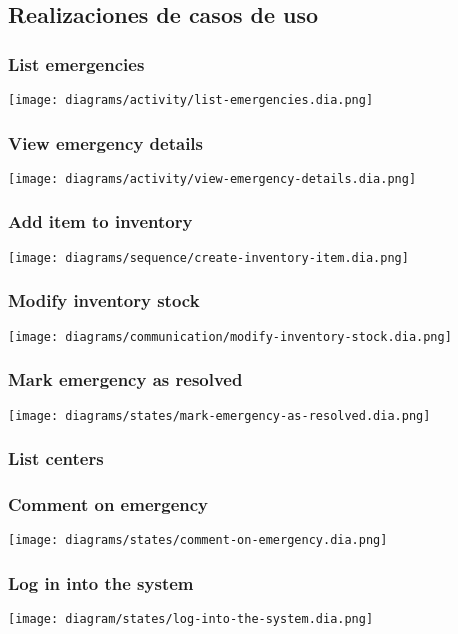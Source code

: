 \subsection{Realizaciones de casos de uso}

\subsubsection{List emergencies}
\texttt{[image: diagrams/activity/list-emergencies.dia.png]}

\subsubsection{View emergency details}
\texttt{[image: diagrams/activity/view-emergency-details.dia.png]}

\subsubsection{Add item to inventory}
\texttt{[image: diagrams/sequence/create-inventory-item.dia.png]}

\subsubsection{Modify inventory stock}
\texttt{[image: diagrams/communication/modify-inventory-stock.dia.png]}

\subsubsection{Mark emergency as resolved}
\texttt{[image: diagrams/states/mark-emergency-as-resolved.dia.png]}

\subsubsection{List centers}

\subsubsection{Comment on emergency}
\texttt{[image: diagrams/states/comment-on-emergency.dia.png]}

\subsubsection{Log in into the system}
\texttt{[image: diagram/states/log-into-the-system.dia.png]}

